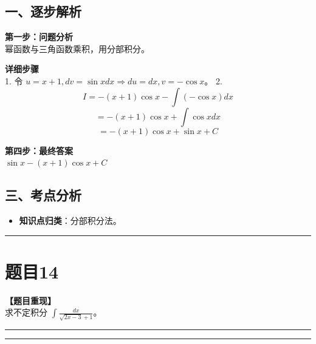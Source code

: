 \documentclass[12pt, a4paper]{ctexart}
\newcommand{\TopSeparator}{
    \par\noindent\rule{\textwidth}{1.5pt}\vspace{0.5em} %
}
\newcommand{\AnalysisSeparator}{
    \par\noindent\rule{\textwidth}{0.5pt}\vspace{0.2em}\hrule\vspace{0.5em} %
}
\newenvironment{RedAnalysis}{
    \par
    \color{red} %
}{
    \par
    \color{black} %
}
\begin{document}
\begin{RedAnalysis}

\subsection*{一、逐步解析}

\textbf{第一步：问题分析} \\
幂函数与三角函数乘积，用分部积分。

\textbf{详细步骤} \\
1. 令 $u = x+1, dv = \sin x dx \Rightarrow du = dx, v = -\cos x$。
2. \[ I = -(x+1)\cos x - \int (-\cos x) dx \]
   \[ = -(x+1)\cos x + \int \cos x dx \]
   \[ = -(x+1)\cos x + \sin x + C \]

\textbf{第四步：最终答案} \\
$ \sin x - (x+1)\cos x + C $

\subsection*{三、考点分析}
\begin{itemize}
    \item \textbf{知识点归类}：分部积分法。
\end{itemize}

\end{RedAnalysis}

\vspace{2em}

\TopSeparator
\section*{题目14}

\textbf{【题目重现】} \\
求不定积分 $ \int\frac{dx}{\sqrt{2x-3}+1} $。

\AnalysisSeparator
\end{document}
